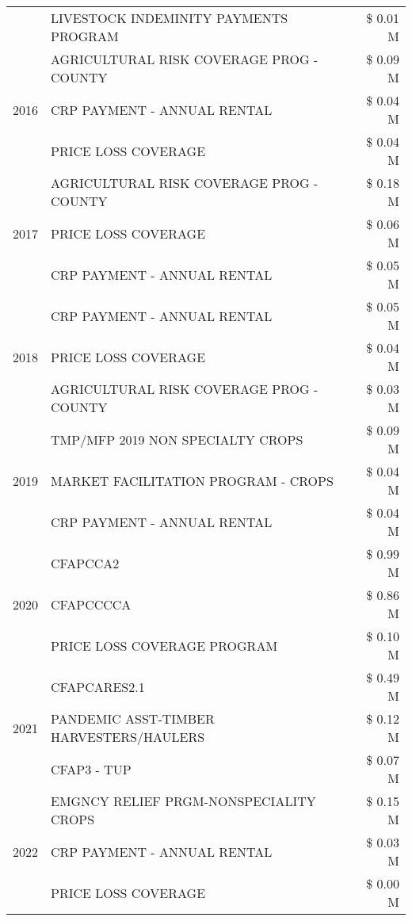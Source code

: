 \begin{tabular}{llr}
 & LIVESTOCK INDEMINITY PAYMENTS PROGRAM & \$ 0.01 M \\
\cline{1-3}
\multirow[t]{3}{*}{2016} & AGRICULTURAL RISK COVERAGE PROG - COUNTY & \$ 0.09 M \\
 & CRP PAYMENT - ANNUAL RENTAL & \$ 0.04 M \\
 & PRICE LOSS COVERAGE & \$ 0.04 M \\
\cline{1-3}
\multirow[t]{3}{*}{2017} & AGRICULTURAL RISK COVERAGE PROG - COUNTY & \$ 0.18 M \\
 & PRICE LOSS COVERAGE & \$ 0.06 M \\
 & CRP PAYMENT - ANNUAL RENTAL & \$ 0.05 M \\
\cline{1-3}
\multirow[t]{3}{*}{2018} & CRP PAYMENT - ANNUAL RENTAL & \$ 0.05 M \\
 & PRICE LOSS COVERAGE & \$ 0.04 M \\
 & AGRICULTURAL RISK COVERAGE PROG - COUNTY & \$ 0.03 M \\
\cline{1-3}
\multirow[t]{3}{*}{2019} & TMP/MFP 2019 NON SPECIALTY CROPS & \$ 0.09 M \\
 & MARKET FACILITATION PROGRAM - CROPS & \$ 0.04 M \\
 & CRP PAYMENT - ANNUAL RENTAL & \$ 0.04 M \\
\cline{1-3}
\multirow[t]{3}{*}{2020} & CFAPCCA2 & \$ 0.99 M \\
 & CFAPCCCCA & \$ 0.86 M \\
 & PRICE LOSS COVERAGE PROGRAM & \$ 0.10 M \\
\cline{1-3}
\multirow[t]{3}{*}{2021} & CFAPCARES2.1 & \$ 0.49 M \\
 & PANDEMIC ASST-TIMBER HARVESTERS/HAULERS & \$ 0.12 M \\
 & CFAP3 - TUP & \$ 0.07 M \\
\cline{1-3}
\multirow[t]{3}{*}{2022} & EMGNCY RELIEF PRGM-NONSPECIALITY CROPS & \$ 0.15 M \\
 & CRP PAYMENT - ANNUAL RENTAL & \$ 0.03 M \\
 & PRICE LOSS COVERAGE & \$ 0.00 M \\
\cline{1-3}
\bottomrule
\end{tabular}
